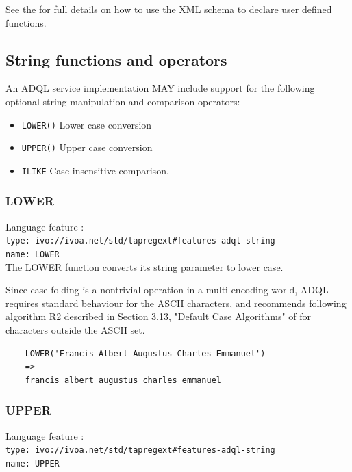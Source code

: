 \documentclass[11pt,a4paper]{ivoa}
\begin{document}
See the \TAPRegSpec{} for full details on how to use the
XML schema to declare user defined functions.

\subsection{String functions and operators}
\label{sec:string.functions}

An ADQL service implementation MAY include support for the following optional
string manipulation and comparison operators:

\begin{itemize}
    \item \verb:LOWER(): Lower case conversion
    \item \verb:UPPER(): Upper case conversion
    \item \verb:ILIKE: Case-insensitive comparison.
\end{itemize}

\subsubsection{LOWER}
\label{sec:string.functions.lower}
{\footnotesize Language feature :}\\
{\footnotesize \verb|type: ivo://ivoa.net/std/tapregext#features-adql-string|}\\
{\footnotesize \verb|name: LOWER|}\\

The LOWER function converts its string parameter to lower case.

Since case folding is a nontrivial operation in a multi-encoding world,
ADQL requires standard behaviour for the ASCII characters, and recommends
following algorithm R2 described in Section 3.13, "Default Case Algorithms"
of \citet{std:UNICODE} for characters outside the ASCII set.

\begin{verbatim}
    LOWER('Francis Albert Augustus Charles Emmanuel')
    =>
    francis albert augustus charles emmanuel
\end{verbatim}

\subsubsection{UPPER}
\label{sec:string.functions.upper}
{\footnotesize Language feature :}\\
{\footnotesize \verb|type: ivo://ivoa.net/std/tapregext#features-adql-string|}\\
{\footnotesize \verb|name: UPPER|}\\
\end{document}

